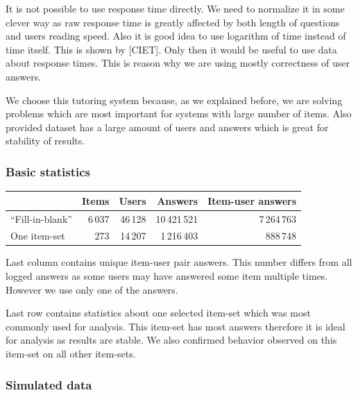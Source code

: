 \documentclass[
  digital, %
  table,   %
  nolof,     %
  nolot,     %
  nocover
]{fithesis3}
\begin{document}
It is not possible to use response time directly. We need to normalize it in some clever way as raw response time is greatly affected by both length of questions and users reading speed. Also it is good idea to use logarithm of time instead of time itself. This is shown by [CIET]. Only then it would be useful to use data about response times. This is reason why we are using mostly correctness of user answers.



We choose this tutoring system because, as we explained before, we are solving problems which are most important for systems with large number of items. Also provided dataset has a large amount of users and answers which is great for stability of results.

\subsubsection{Basic statistics}\label{basic-statistics}

\begin{center}
  \begin{tabular}{|l|r r r r|}
    \hline
     & Items & Users & Answers & Item-user answers \\
    \hline\hline
    ``Fill-in-blank'' & 6\,037 & 46\,128 & 10\,421\,521 & 7\,264\,763 \\
    \hline
    One item-set & 273 & 14\,207 & 1\,216\,403 & 888\,748 \\
    \hline
  \end{tabular}
\end{center}

Last column contains unique item-user pair answers. This number differs from all logged answers as some users may have answered some item multiple times. However we use only one of the answers.

Last row contains statistics about one selected item-set which was most commonly used for analysis. This item-set has most answers therefore it is ideal for analysis as results are stable. We also confirmed behavior observed on this item-set on all other item-sets.

\subsubsection{Simulated data}\label{simulated-data}
\end{document}
